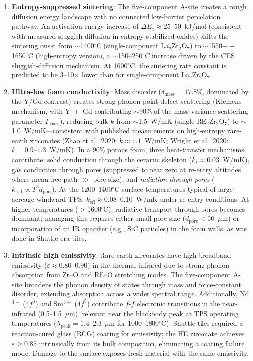 \documentclass[12pt,letterpaper]{article}
\theoremstyle{definition}
\begin{document}
\begin{enumerate}
  \item \textbf{Entropy-suppressed sintering}: The five-component A-site creates a rough diffusion energy landscape with no connected low-barrier percolation pathway.  An activation-energy increase of $\Delta E_a \approx 25$--$50$~kJ/mol (consistent with measured sluggish diffusion in entropy-stabilized oxides) shifts the sintering onset from $\sim$1400$^\circ$C (single-component La$_2$Zr$_2$O$_7$) to $\sim$1550$--$1650$^\circ$C (high-entropy version), a $\sim$150--250$^\circ$C increase driven by the CES sluggish-diffusion mechanism.  At 1600$^\circ$C, the sintering rate constant is predicted to be 3--10$\times$ lower than for single-component La$_2$Zr$_2$O$_7$.

  \item \textbf{Ultra-low foam conductivity}: Mass disorder ($\delta_{\mathrm{mass}} = 17.8\%$, dominated by the Y/Gd contrast) creates strong phonon point-defect scattering (Klemens mechanism, with Y~+~Gd contributing $\sim$90\% of the mass-variance scattering parameter $\Gamma_{\mathrm{mass}}$), reducing bulk $k$ from $\sim$1.5~W/mK (single RE$_2$Zr$_2$O$_7$) to $\sim$1.0~W/mK---consistent with published measurements on high-entropy rare-earth zirconates (Zhao et al.\ 2020: $k \approx 1.1$~W/mK; Wright et al.\ 2020: $k = 0.9$--$1.3$~W/mK).  In a 90\% porous foam, three heat-transfer mechanisms contribute: solid conduction through the ceramic skeleton ($k_s \approx 0.03$~W/mK), gas conduction through pores (suppressed to near zero at re-entry altitudes where mean free path $\gg$ pore size), and \emph{radiation through pores} ($k_{\mathrm{rad}} \propto T^3 d_{\mathrm{pore}}$).  At the 1200--1400$^\circ$C surface temperatures typical of large-acreage windward TPS, $k_{\mathrm{eff}} \approx 0.08$--$0.10$~W/mK under re-entry conditions.  At higher temperatures ($>$1600$^\circ$C), radiative transport through pores becomes dominant; managing this requires either small pore size ($d_{\mathrm{pore}} < 50$~$\mu$m) or incorporation of an IR opacifier (e.g., SiC particles) in the foam walls, as was done in Shuttle-era tiles.

  \item \textbf{Intrinsic high emissivity}: Rare-earth zirconates have high broadband emissivity ($\varepsilon \approx 0.80$--$0.90$) in the thermal infrared due to strong phonon absorption from Zr--O and RE--O stretching modes.  The five-component A-site broadens the phonon density of states through mass and force-constant disorder, extending absorption across a wider spectral range.  Additionally, Nd$^{3+}$ ($4f^3$) and Sm$^{3+}$ ($4f^5$) contribute $f$-$f$ electronic transitions in the near-infrared (0.5--1.5~$\mu$m), relevant near the blackbody peak at TPS operating temperatures ($\lambda_{\mathrm{peak}} = 1.4$--$2.3$~$\mu$m for 1000--1800$^\circ$C).  Shuttle tiles required a reaction-cured glass (RCG) coating for emissivity; the HE zirconate achieves $\varepsilon \geq 0.85$ intrinsically from its bulk composition, eliminating a coating failure mode.  Damage to the surface exposes fresh material with the same emissivity.
\end{enumerate}
\end{document}
